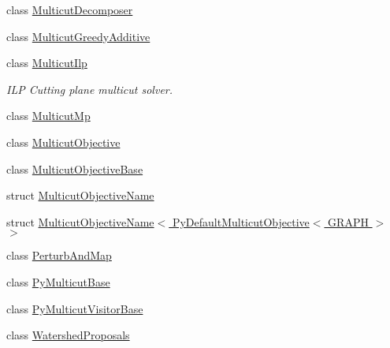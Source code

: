 \begin{DoxyCompactItemize}
\item 
class \hyperlink{classnifty_1_1graph_1_1opt_1_1multicut_1_1MulticutDecomposer}{Multicut\+Decomposer}
\item 
class \hyperlink{classnifty_1_1graph_1_1opt_1_1multicut_1_1MulticutGreedyAdditive}{Multicut\+Greedy\+Additive}
\item 
class \hyperlink{classnifty_1_1graph_1_1opt_1_1multicut_1_1MulticutIlp}{Multicut\+Ilp}
\begin{DoxyCompactList}\small\item\em I\+LP Cutting plane multicut solver. \end{DoxyCompactList}\item 
class \hyperlink{classnifty_1_1graph_1_1opt_1_1multicut_1_1MulticutMp}{Multicut\+Mp}
\item 
class \hyperlink{classnifty_1_1graph_1_1opt_1_1multicut_1_1MulticutObjective}{Multicut\+Objective}
\item 
class \hyperlink{classnifty_1_1graph_1_1opt_1_1multicut_1_1MulticutObjectiveBase}{Multicut\+Objective\+Base}
\item 
struct \hyperlink{structnifty_1_1graph_1_1opt_1_1multicut_1_1MulticutObjectiveName}{Multicut\+Objective\+Name}
\item 
struct \hyperlink{structnifty_1_1graph_1_1opt_1_1multicut_1_1MulticutObjectiveName_3_01PyDefaultMulticutObjective_3_01GRAPH_01_4_01_4}{Multicut\+Objective\+Name$<$ Py\+Default\+Multicut\+Objective$<$ G\+R\+A\+P\+H $>$ $>$}
\item 
class \hyperlink{classnifty_1_1graph_1_1opt_1_1multicut_1_1PerturbAndMap}{Perturb\+And\+Map}
\item 
class \hyperlink{classnifty_1_1graph_1_1opt_1_1multicut_1_1PyMulticutBase}{Py\+Multicut\+Base}
\item 
class \hyperlink{classnifty_1_1graph_1_1opt_1_1multicut_1_1PyMulticutVisitorBase}{Py\+Multicut\+Visitor\+Base}
\item 
class \hyperlink{classnifty_1_1graph_1_1opt_1_1multicut_1_1WatershedProposals}{Watershed\+Proposals}
\end{DoxyCompactItemize}

